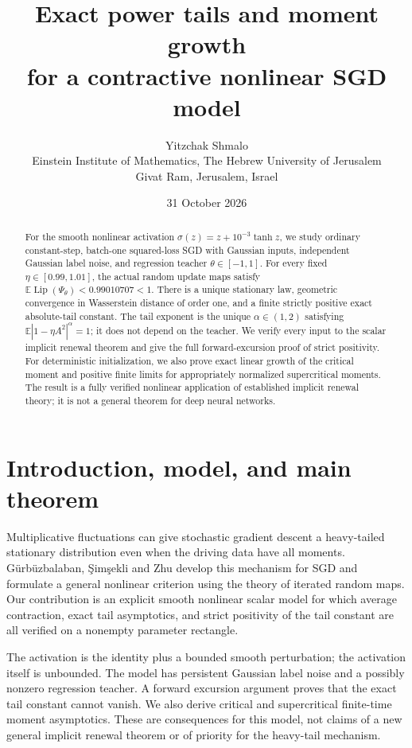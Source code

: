 \documentclass[11pt,a4paper]{article}
\title{\vspace{-1.4em}\textbf{Exact power tails and moment growth\\for a contractive nonlinear SGD model}}
\author{Yitzchak Shmalo\\[0.4em]
\small Einstein Institute of Mathematics, The Hebrew University of Jerusalem\\
\small Givat Ram, Jerusalem, Israel}
\date{31 October 2026}
\numberwithin{equation}{section}
\theoremstyle{remark}
\DeclareMathOperator{\Lip}{Lip}
\newcommand{\E}{\mathbb E}
\begin{document}
\maketitle
\thispagestyle{plain}

\begin{abstract}
For the smooth nonlinear activation $\sigma(z)=z+10^{-3}\tanh z$, we study
ordinary constant-step, batch-one squared-loss SGD with Gaussian inputs,
independent Gaussian label noise, and regression teacher $\theta\in[-1,1]$.
For every fixed $\eta\in[0.99,1.01]$, the actual random update maps satisfy
$\E\Lip(\Psi_\theta)<0.99010707<1$. There is a unique stationary law,
geometric convergence in Wasserstein distance of order one, and a finite
strictly positive exact absolute-tail constant. The tail exponent is the
unique $\alpha\in(1,2)$ satisfying $\E|1-\eta A^2|^\alpha=1$; it does not
depend on the teacher. We verify every input to the scalar implicit renewal
theorem and give the full forward-excursion proof of strict positivity.
For deterministic initialization, we also prove exact linear growth of the
critical moment and positive finite limits for appropriately normalized
supercritical moments. The result is a fully verified nonlinear application
of established implicit renewal theory; it is not a general theorem for
deep neural networks.
\end{abstract}

\section{Introduction, model, and main theorem}
\label{sec:main}

Multiplicative fluctuations can give stochastic gradient descent a
heavy-tailed stationary distribution even when the driving data have all
moments. G\"urb\"uzbalaban, \c{S}im\c{s}ekli and Zhu
\cite{Gurbuzbalaban2021} develop this mechanism for SGD and formulate a
general nonlinear criterion using the theory of iterated random maps.
Our contribution is an explicit smooth nonlinear scalar model for which
average contraction, exact tail asymptotics, and strict positivity of the
tail constant are all verified on a nonempty parameter rectangle.

The activation is the identity plus a bounded smooth perturbation; the
activation itself is unbounded. The model has persistent Gaussian label
noise and a possibly nonzero regression teacher. A forward excursion
argument proves that the exact tail constant cannot vanish. We also
derive critical and supercritical finite-time moment asymptotics. These
are consequences for this model, not claims of a new general implicit
renewal theorem or of priority for the heavy-tail mechanism.
\end{document}
